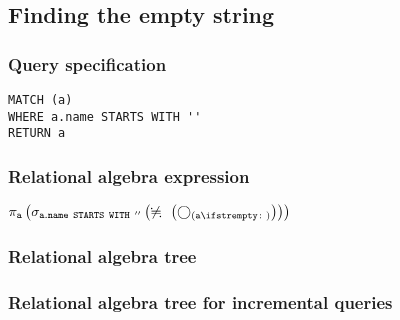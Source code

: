 \subsection{Finding the empty string}

\subsubsection*{Query specification}

\begin{lstlisting}
MATCH (a)
WHERE a.name STARTS WITH ''
RETURN a
\end{lstlisting}

\subsubsection*{Relational algebra expression}

$\projection{\var{a}} \left(\selection{\mathtt{a.name~STARTS~WITH~''}} \left(\alldifferent{} \left(\getvertices{a}{}\right)\right)\right)$

\subsubsection*{Relational algebra tree}


\subsubsection*{Relational algebra tree for incremental queries}


